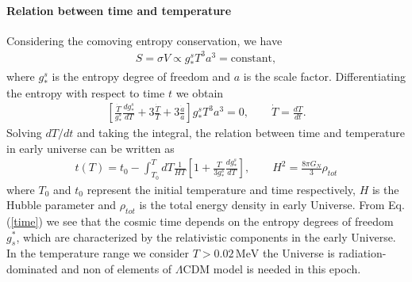 \paragraph{Relation between time and temperature}
Considering the comoving entropy conservation, we have
\begin{align}
S=\sigma V\propto g^s_\ast T^3a^3=\mathrm{constant},
\end{align}
where $g^s_\ast$ is the entropy degree of freedom and $a$ is the scale factor. Differentiating the entropy with respect to time $t$ we obtain
\begin{align}
\left[\frac{\dot{T}}{g^s_\ast}\frac{dg^s_\ast}{dT}+3\frac{\dot{T}}{T}+3\frac{\dot{a}}{a}\right]g^s_\ast T^3a^3=0,\qquad \dot{T}=\frac{dT}{dt}.
\end{align}
Solving $dT/dt$ and taking the integral, the relation between time and temperature in early universe can be written as
\begin{align}\label{time}
t(T)=t_0-\int^T_{T_0}dT\frac{1}{HT}\left[1+\frac{T}{3g^s_\ast}\frac{dg^s_\ast}{dT}\right],\qquad H^2=\frac{8\pi G_N}{3}\rho_{tot}
\end{align}
where $T_0$ and $t_0$ represent the initial temperature and time respectively, $H$ is the Hubble parameter and $\rho_{tot}$ is the total energy density in early Universe. From Eq. (\ref{time}) we see that the cosmic time depends on the entropy degrees of freedom $g^\ast_s$, which are characterized by the relativistic components in the early Universe. In the temperature range we consider  $T>0.02\,\mathrm{MeV}$ the Universe is radiation-dominated and non of elements of $\Lambda$CDM model is needed in this epoch.   
 


